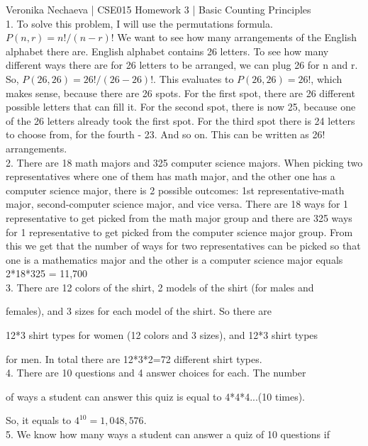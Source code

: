\documentclass[10pt]{article}
\begin{document}
Veronika Nechaeva | CSE015 Homework 3 | Basic Counting Principles
 \\[\baselineskip]
1. To solve this problem, I will use the permutations formula. 
$P(n,r)=n!/(n-r)!$ We want to see how many arrangements of the 
English alphabet there are. English alphabet contains 26 letters.
To see how many different ways there are for 26 letters to be arranged, 
we can plug 26 for n and r. So, $P(26,26)=26!/(26-26)!$.
This evaluates to $P(26,26)=26!$, which makes sense, because there are 
26 spots. For the first spot, there are 26 different possible letters
that can fill it. For the second spot, there is now 25, because one
of the 26 letters already took the first spot. For the third spot 
there is 24 letters to choose from, for the fourth - 23. And so on.
This can be written as 26! arrangements. \\[\baselineskip]

2. There are 18 math majors and 325 computer science majors. When picking two representatives 
where one of them has math major, and the other one has a computer science major, there is 2 possible
outcomes: 1st representative-math major, second-computer science major, 
and vice versa. There are 18 ways for 1 representative to get picked from 
the math major group and there are 325 ways for 1 representative to get picked 
from the computer science major group. From this we get that the number of ways for 
two representatives can be picked so that one is a mathematics major and the other is a 
computer science major equals 2*18*325 = 11,700 \\[\baselineskip]

3. There are 12 colors of the shirt, 2 models of the shirt (for males and 

females), and 3 sizes for each model of the shirt. So there are 

12*3 shirt types for women (12 colors and 3 sizes), and 12*3 shirt types

for men. In total there are 12*3*2=72 different shirt types. \\[\baselineskip]

4. There are 10 questions and 4 answer choices for each. The number 

of ways a student can answer this quiz is equal to 4*4*4...(10 times).

So, it equals to $4^{10}=1,048,576$. \\[\baselineskip]

5. We know how many ways a student can answer a quiz of 10 questions if
\end{document}
